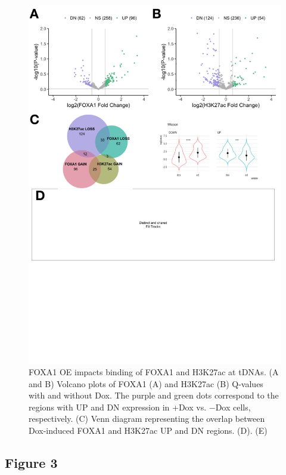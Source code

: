 \documentclass[
  11pt,
]{article}
\begin{document}
\begin{figure}[p]

{\centering \includegraphics[width=1\linewidth]{../images/results-02} 

}

\caption{FOXA1 OE impacts binding of FOXA1 and H3K27ac at tDNAs. (A and B) Volcano plots of FOXA1 (A) and H3K27ac (B) Q-values with and without Dox. The purple and green dots correspond to the regions with UP and DN expression in +Dox vs. −Dox cells, respectively. (C) Venn diagram representing the overlap between Dox-induced FOXA1 and H3K27ac UP and DN regions. (D). (E)}\label{fig:results-2}
\end{figure}

\hypertarget{figure-3}{%
\subsection{Figure 3}\label{figure-3}}
\end{document}
